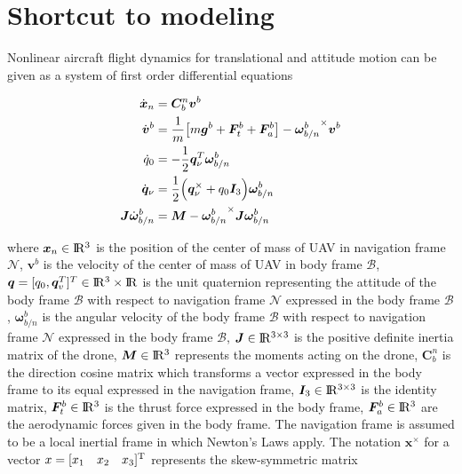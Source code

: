 \section{Shortcut to modeling}

Nonlinear aircraft flight dynamics for translational and attitude motion can be given as a system of first order differential equations 

\begin{align}{\label{eqn:compactEquOfMotion}}
\begin{split}
\dot{\bm{x}}_{n} &= \bm{C}_b^n \bm{v}^b\\
\dot{\bm{v}}^b &= \frac{1}{m} \big[ m \bm{g}^b + \bm{F}_t^b + \bm{F}_a^b \big] - {\bm{\omega}_{b/n}^b}^\times \bm{v}^b  \\
\dot{q}_0 &= -\frac{1}{2} \bm{q}_\nu^T \bm{\omega}_{b/n}^b\\
\dot{\bm{q}}_\nu &= \frac{1}{2}\Big(\bm{q}_\nu^\times + q_0 \bm{I}_3 \Big) \bm{\omega}_{b/n}^b \\
\bm{J} \dot{\bm{\omega}}_{b/n}^b &= \bm{M} - {\bm{\omega}_{b/n}^b}^\times \bm{J} \bm{\omega}_{b/n}^b\\
\end{split}
\end{align}

where $\bm{x}_{n} \in {\rm I\!R^3}  $ is the position of the center of mass of UAV in navigation frame $\mathcal{N}$, $\bm{v}^b$ is the velocity of the center of mass of UAV in body frame $\mathcal{B}$,  $\bm{q} = [q_0, \bm{q}_v^T] ^T \in {\rm I\!R^3} \times {\rm I\!R}$ is the unit quaternion representing the attitude of the body frame $\mathcal{B}$ with respect to navigation frame $\mathcal{N}$ expressed in the body frame $\mathcal{B}$, $\bm{\omega}_{b/n}^b$ is the angular velocity of the body frame $\mathcal{B}$ with respect to navigation frame $\mathcal{N}$ expressed in the body frame $\mathcal{B}$, $ \bm{J} \in {\rm I\!R^{3\times3}}  $ is the positive definite inertia matrix of the drone, $\bm{M} \in {\rm I\!R^3}$ represents the moments acting on the drone, $ \bm{C}_b^n$ is the direction cosine matrix which transforms a vector expressed in the body frame to its equal expressed in the navigation frame, $\bm{I}_3  \in {\rm I\!R^{3\times3}}$ is the identity matrix, $\bm{F}_t^b \in {\rm I\!R^3}$ is the thrust force expressed in the body frame,  $\bm{F}_a^b \in {\rm I\!R^3}$ are the aerodynamic forces given in the body frame. 
The navigation frame is assumed to be a local inertial frame in which Newton's Laws apply. 
The notation $\bm{x} ^{\times} $ for a vector $x = [x_1 \quad x_2 \quad x_3]^ {\rm{T}}$ represents the skew-symmetric matrix

